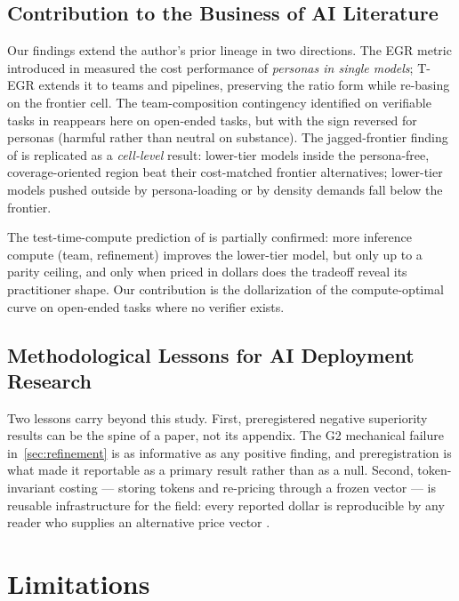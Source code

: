 \documentclass[12pt,a4paper]{article}
\begin{document}
\subsection{Contribution to the Business of AI Literature}

Our findings extend the author's prior lineage in two directions. The EGR metric
introduced in \citet{Hariri2026b} measured the cost performance of \emph{personas
in single models}; T-EGR extends it to teams and pipelines, preserving the ratio
form while re-basing on the frontier cell. The team-composition contingency
identified on verifiable tasks in \citet{Hariri2025b} reappears here on open-ended
tasks, but with the sign reversed for personas (harmful rather than neutral on
substance). The jagged-frontier finding of \citet{DellAcquaEtAl2023} is replicated
as a \emph{cell-level} result: lower-tier models inside the persona-free,
coverage-oriented region beat their cost-matched frontier alternatives; lower-tier
models pushed outside by persona-loading or by density demands fall below the
frontier.

The test-time-compute prediction of \citet{SnellEtAl2024} is partially confirmed:
more inference compute (team, refinement) improves the lower-tier model, but only up
to a parity ceiling, and only when priced in dollars does the tradeoff reveal its
practitioner shape. Our contribution is the dollarization of the compute-optimal
curve on open-ended tasks where no verifier exists.

\subsection{Methodological Lessons for AI Deployment Research}

Two lessons carry beyond this study. First, preregistered negative superiority
results can be the spine of a paper, not its appendix. The G2 mechanical failure
in~\cref{sec:refinement} is as informative as any positive finding, and
preregistration is what made it reportable as a primary result rather than as a
null. Second, token-invariant costing --- storing tokens and re-pricing through a
frozen vector --- is reusable infrastructure for the field: every reported dollar
is reproducible by any reader who supplies an alternative price vector
\citep{Diewert1976, SandveEtAl2013}.


\section{Limitations}\label{sec:limitations}
\end{document}
